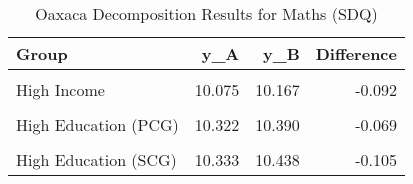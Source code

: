 \begin{table}[!h]

\caption{Oaxaca Decomposition Results for Maths (SDQ)}
\centering
\begin{tabular}[t]{lrrr}
\toprule
Group & y\_A & y\_B & Difference\\
\midrule
\cellcolor{gray!6}{Low Income} & \cellcolor{gray!6}{9.235} & \cellcolor{gray!6}{9.348} & \cellcolor{gray!6}{-0.113}\\
High Income & 10.075 & 10.167 & -0.092\\
\cellcolor{gray!6}{Low Education (PCG)} & \cellcolor{gray!6}{9.371} & \cellcolor{gray!6}{9.454} & \cellcolor{gray!6}{-0.083}\\
High Education (PCG) & 10.322 & 10.390 & -0.069\\
\cellcolor{gray!6}{Low Education (SCG)} & \cellcolor{gray!6}{9.389} & \cellcolor{gray!6}{9.444} & \cellcolor{gray!6}{-0.056}\\
\addlinespace
High Education (SCG) & 10.333 & 10.438 & -0.105\\
\bottomrule
\end{tabular}
\end{table}
